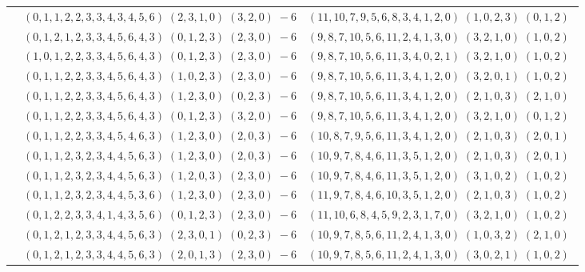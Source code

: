 \documentclass[11pt]{article}
\begin{document}
\begin{longtable}[l]{|c|c|c|}
 \cline{2-3} 
 & $(0 ,1 ,1 ,2 ,2 ,3 ,3 ,4 ,3 ,4 ,5 ,6) \;(2 ,3 ,1 ,0) \;(3 ,2 ,0) \;-6$ & $(11 ,10 ,7 ,9 ,5 ,6 ,8 ,3 ,4 ,1 ,2 ,0) \;(1 ,0 ,2 ,3) \;(0 ,1 ,2) \;$\\ 
 \cline{2-3} 
 & $(0 ,1 ,2 ,1 ,2 ,3 ,3 ,4 ,5 ,6 ,4 ,3) \;(0 ,1 ,2 ,3) \;(2 ,3 ,0) \;-6$ & $(9 ,8 ,7 ,10 ,5 ,6 ,11 ,2 ,4 ,1 ,3 ,0) \;(3 ,2 ,1 ,0) \;(1 ,0 ,2) \;$\\ 
 \cline{2-3} 
 & $(1 ,0 ,1 ,2 ,2 ,3 ,3 ,4 ,5 ,6 ,4 ,3) \;(0 ,1 ,2 ,3) \;(2 ,3 ,0) \;-6$ & $(9 ,8 ,7 ,10 ,5 ,6 ,11 ,3 ,4 ,0 ,2 ,1) \;(3 ,2 ,1 ,0) \;(1 ,0 ,2) \;$\\ 
 \cline{2-3} 
 & $(0 ,1 ,1 ,2 ,2 ,3 ,3 ,4 ,5 ,6 ,4 ,3) \;(1 ,0 ,2 ,3) \;(2 ,3 ,0) \;-6$ & $(9 ,8 ,7 ,10 ,5 ,6 ,11 ,3 ,4 ,1 ,2 ,0) \;(3 ,2 ,0 ,1) \;(1 ,0 ,2) \;$\\ 
 \cline{2-3} 
 & $(0 ,1 ,1 ,2 ,2 ,3 ,3 ,4 ,5 ,6 ,4 ,3) \;(1 ,2 ,3 ,0) \;(0 ,2 ,3) \;-6$ & $(9 ,8 ,7 ,10 ,5 ,6 ,11 ,3 ,4 ,1 ,2 ,0) \;(2 ,1 ,0 ,3) \;(2 ,1 ,0) \;$\\ 
 \cline{2-3} 
 & $(0 ,1 ,1 ,2 ,2 ,3 ,3 ,4 ,5 ,6 ,4 ,3) \;(0 ,1 ,2 ,3) \;(3 ,2 ,0) \;-6$ & $(9 ,8 ,7 ,10 ,5 ,6 ,11 ,3 ,4 ,1 ,2 ,0) \;(3 ,2 ,1 ,0) \;(0 ,1 ,2) \;$\\ 
 \cline{2-3} 
 & $(0 ,1 ,1 ,2 ,2 ,3 ,3 ,4 ,5 ,4 ,6 ,3) \;(1 ,2 ,3 ,0) \;(2 ,0 ,3) \;-6$ & $(10 ,8 ,7 ,9 ,5 ,6 ,11 ,3 ,4 ,1 ,2 ,0) \;(2 ,1 ,0 ,3) \;(2 ,0 ,1) \;$\\ 
 \cline{2-3} 
 & $(0 ,1 ,1 ,2 ,3 ,2 ,3 ,4 ,4 ,5 ,6 ,3) \;(1 ,2 ,3 ,0) \;(2 ,0 ,3) \;-6$ & $(10 ,9 ,7 ,8 ,4 ,6 ,11 ,3 ,5 ,1 ,2 ,0) \;(2 ,1 ,0 ,3) \;(2 ,0 ,1) \;$\\ 
 \cline{2-3} 
 & $(0 ,1 ,1 ,2 ,3 ,2 ,3 ,4 ,4 ,5 ,6 ,3) \;(1 ,2 ,0 ,3) \;(2 ,3 ,0) \;-6$ & $(10 ,9 ,7 ,8 ,4 ,6 ,11 ,3 ,5 ,1 ,2 ,0) \;(3 ,1 ,0 ,2) \;(1 ,0 ,2) \;$\\ 
 \cline{2-3} 
 & $(0 ,1 ,1 ,2 ,3 ,2 ,3 ,4 ,4 ,5 ,3 ,6) \;(1 ,2 ,3 ,0) \;(2 ,3 ,0) \;-6$ & $(11 ,9 ,7 ,8 ,4 ,6 ,10 ,3 ,5 ,1 ,2 ,0) \;(2 ,1 ,0 ,3) \;(1 ,0 ,2) \;$\\ 
 \cline{2-3} 
 & $(0 ,1 ,2 ,2 ,3 ,3 ,4 ,1 ,4 ,3 ,5 ,6) \;(0 ,1 ,2 ,3) \;(2 ,3 ,0) \;-6$ & $(11 ,10 ,6 ,8 ,4 ,5 ,9 ,2 ,3 ,1 ,7 ,0) \;(3 ,2 ,1 ,0) \;(1 ,0 ,2) \;$\\ 
 \cline{2-3} 
 & $(0 ,1 ,2 ,1 ,2 ,3 ,3 ,4 ,4 ,5 ,6 ,3) \;(2 ,3 ,0 ,1) \;(0 ,2 ,3) \;-6$ & $(10 ,9 ,7 ,8 ,5 ,6 ,11 ,2 ,4 ,1 ,3 ,0) \;(1 ,0 ,3 ,2) \;(2 ,1 ,0) \;$\\ 
 \cline{2-3} 
 & $(0 ,1 ,2 ,1 ,2 ,3 ,3 ,4 ,4 ,5 ,6 ,3) \;(2 ,0 ,1 ,3) \;(2 ,3 ,0) \;-6$ & $(10 ,9 ,7 ,8 ,5 ,6 ,11 ,2 ,4 ,1 ,3 ,0) \;(3 ,0 ,2 ,1) \;(1 ,0 ,2) \;$\\ 

\end{longtable}
\end{document}

